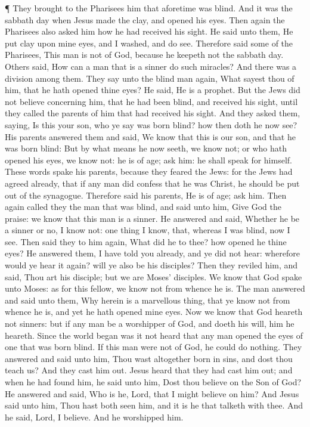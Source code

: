  ¶ They brought to the Pharisees him that aforetime was
blind.  And it was the sabbath day when Jesus made the
clay, and opened his eyes.  Then again the Pharisees also
asked him how he had received his sight. He said unto them, He put clay
upon mine eyes, and I washed, and do see.  Therefore said
some of the Pharisees, This man is not of God, because he keepeth not
the sabbath day. Others said, How can a man that is a sinner do such
miracles? And there was a division among them.  They say
unto the blind man again, What sayest thou of him, that he hath opened
thine eyes? He said, He is a prophet.  But the Jews did not
believe concerning him, that he had been blind, and received his sight,
until they called the parents of him that had received his sight.
 And they asked them, saying, Is this your son, who ye say
was born blind? how then doth he now see?  His parents
answered them and said, We know that this is our son, and that he was
born blind:  But by what means he now seeth, we know not;
or who hath opened his eyes, we know not: he is of age; ask him: he
shall speak for himself.  These words spake his parents,
because they feared the Jews: for the Jews had agreed already, that if
any man did confess that he was Christ, he should be put out of the
synagogue.  Therefore said his parents, He is of age; ask
him.  Then again called they the man that was blind, and
said unto him, Give God the praise: we know that this man is a sinner.
 He answered and said, Whether he be a sinner or no, I know
not: one thing I know, that, whereas I was blind, now I see.
 Then said they to him again, What did he to thee? how
opened he thine eyes?  He answered them, I have told you
already, and ye did not hear: wherefore would ye hear it again? will ye
also be his disciples?  Then they reviled him, and said,
Thou art his disciple; but we are Moses' disciples.  We
know that God spake unto Moses: as for this fellow, we know not from
whence he is.  The man answered and said unto them, Why
herein is a marvellous thing, that ye know not from whence he is, and
yet he hath opened mine eyes.  Now we know that God heareth
not sinners: but if any man be a worshipper of God, and doeth his will,
him he heareth.  Since the world began was it not heard
that any man opened the eyes of one that was born blind. 
If this man were not of God, he could do nothing.  They
answered and said unto him, Thou wast altogether born in sins, and dost
thou teach us? And they cast him out.  Jesus heard that
they had cast him out; and when he had found him, he said unto him, Dost
thou believe on the Son of God?  He answered and said, Who
is he, Lord, that I might believe on him?  And Jesus said
unto him, Thou hast both seen him, and it is he that talketh with thee.
 And he said, Lord, I believe. And he worshipped him.

